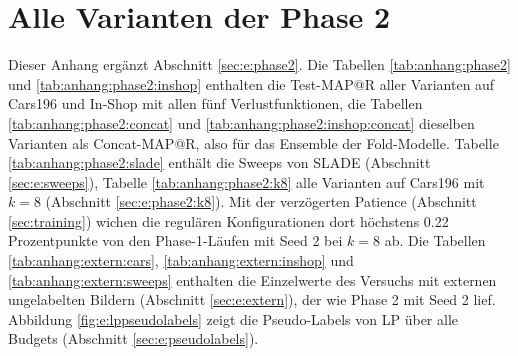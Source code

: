 

\clearpage







\chapter{Alle Varianten der Phase 2}
\label{chap:anhang:phase2}

Dieser Anhang ergänzt Abschnitt \ref{sec:e:phase2}. Die Tabellen \ref{tab:anhang:phase2} und \ref{tab:anhang:phase2:inshop} enthalten die Test-\ac{MAP@R} aller Varianten auf Cars196 und In-Shop mit allen fünf Verlustfunktionen, die Tabellen \ref{tab:anhang:phase2:concat} und \ref{tab:anhang:phase2:inshop:concat} dieselben Varianten als Concat-\ac{MAP@R}, also für das Ensemble der Fold-Modelle. Tabelle \ref{tab:anhang:phase2:slade} enthält die Sweeps von \ac{SLADE} (Abschnitt \ref{sec:e:sweeps}), Tabelle \ref{tab:anhang:phase2:k8} alle Varianten auf Cars196 mit $k=8$ (Abschnitt \ref{sec:e:phase2:k8}). Mit der verzögerten Patience (Abschnitt \ref{sec:training}) wichen die regulären Konfigurationen dort höchstens \num{0.22} Prozentpunkte von den Phase-1-Läufen mit Seed 2 bei $k=8$ ab. Die Tabellen \ref{tab:anhang:extern:cars}, \ref{tab:anhang:extern:inshop} und \ref{tab:anhang:extern:sweeps} enthalten die Einzelwerte des Versuchs mit externen ungelabelten Bildern (Abschnitt \ref{sec:e:extern}), der wie Phase 2 mit Seed 2 lief. Abbildung \ref{fig:e:lppseudolabels} zeigt die Pseudo-Labels von \ac{LP} über alle Budgets (Abschnitt \ref{sec:e:pseudolabels}).

